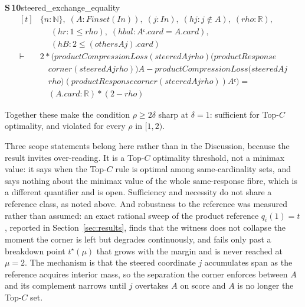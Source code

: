 \documentclass[conference]{IEEEtran}
\theoremstyle{definition}
\newcommand{\lean}[1]{\textsf{\footnotesize #1}}
\begin{document}
\noindent\textbf{S\,10}\quad\lean{steered\_exchange\_equality}
{\footnotesize\[ \begin{aligned}[t]
&\{ \mathit{n} : \mathbb{N} \},\; (\mathit{A} : \mathit{Finset} (\mathit{I} \mathit{n})),\; (\mathit{j} : \mathit{I} \mathit{n}),\; (\mathit{hj} : \mathit{j} \notin \mathit{A}),\; (\mathit{rho} : \mathbb{R} ),\\
&\quad \; (\mathit{hr} : 1 \leq \mathit{rho}),\; (\mathit{hbal} : \mathit{Aᶜ}.\mathit{card}=\mathit{A}.\mathit{card}),\\
&\quad \; (\mathit{hB} : 2 \leq (\mathit{others} \mathit{A} \mathit{j}).\mathit{card})\\
\vdash\;&2*(\mathit{productCompressionLoss} (\mathit{steered} \mathit{A} \mathit{j} \mathit{rho}) (\mathit{productResponse}\\
&\quad \mathit{corner} (\mathit{steered} \mathit{A} \mathit{j} \mathit{rho})) \mathit{A}- \mathit{productCompressionLoss} (\mathit{steered} \mathit{A} \mathit{j}\\
&\quad \mathit{rho}) (\mathit{productResponse} \mathit{corner} (\mathit{steered} \mathit{A} \mathit{j} \mathit{rho})) \mathit{Aᶜ})=\\
&\quad (\mathit{A}.\mathit{card}:\mathbb{R} )*(2-\mathit{rho})
\end{aligned} \]}


Together these make the condition $\rho\ge2\delta$ sharp at $\delta=1$: sufficient for
Top-$C$ optimality, and violated for every $\rho$ in $[1,2)$.

Three scope statements belong here rather than in the Discussion, because the result invites
over-reading. It is a Top-$C$ optimality threshold, not a minimax value: it says when the
Top-$C$ rule is optimal among same-cardinality sets, and says nothing about the minimax value
of the whole same-response fibre, which is a different quantifier and is open. Sufficiency and
necessity do not share a reference class, as noted above. And robustness to the reference
was measured rather than assumed: an exact rational sweep of the product reference
$q_{i}(1)=t$, reported in Section~\ref{sec:results}, finds that the witness does not collapse
the moment the corner is left but degrades continuously, and fails only past a breakdown point
$t^{\star}(\mu)$ that grows with the margin and is never reached at $\mu=2$. The mechanism is
that the steered coordinate $j$ accumulates span as the reference acquires interior mass, so
the separation the corner enforces between $A$ and its complement narrows until $j$ overtakes
$A$ on score and $A$ is no longer the Top-$C$ set.
\end{document}
